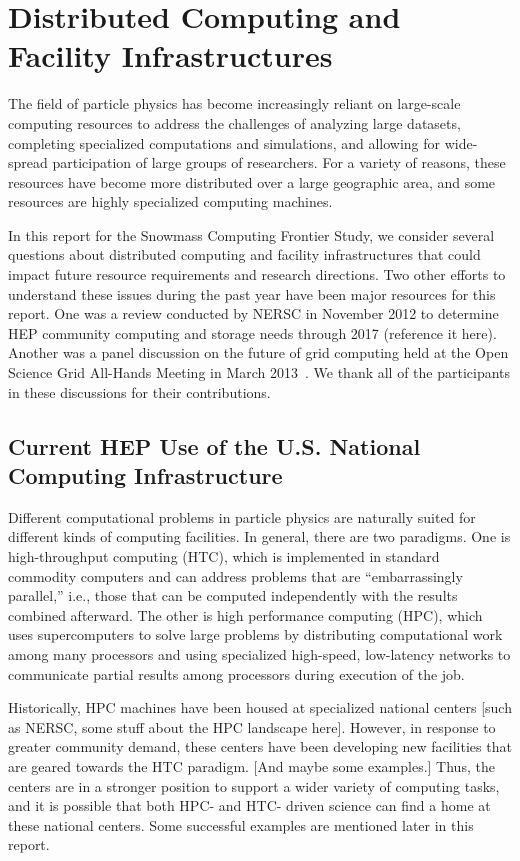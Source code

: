 \section{Distributed Computing and Facility Infrastructures}


The field of particle physics has become increasingly reliant on large-scale computing resources to address the challenges of analyzing large datasets, completing specialized computations and simulations, and allowing for wide-spread participation of large groups of researchers.  For a variety of reasons, these resources have become more distributed over a large geographic area, and some resources are highly specialized computing machines.

In this report for the Snowmass Computing Frontier Study, we consider several questions about distributed computing and facility infrastructures that could impact future resource requirements and research directions.  Two other efforts to understand these issues during the past year have been major resources for this report.  One was a review conducted by NERSC in November 2012 to determine HEP community computing and storage needs through 2017 (reference it here).  Another was a panel discussion on the future of grid computing held at the Open Science Grid All-Hands Meeting in March 2013~\cite{bib:OSGpanel}.  We thank all of the participants in these discussions for their contributions.

\subsection{Current HEP Use of the U.S. National Computing Infrastructure}

Different computational problems in particle physics are naturally suited for different kinds of computing facilities.  In general, there are two paradigms.  One is high-throughput computing (HTC), which is implemented in standard commodity computers and can address problems that are ``embarrassingly parallel,'' i.e., those that can be computed independently with the results combined afterward.  The other is high performance computing (HPC), which uses supercomputers to solve large problems by distributing computational work among many processors and using specialized high-speed, low-latency networks to communicate partial results among processors during execution of the job.

Historically, HPC machines have been housed at specialized national centers [such as NERSC, some stuff about the HPC landscape here].  However, in response to greater community demand, these centers have been developing new facilities that are geared towards the HTC paradigm.  [And maybe some examples.]  Thus, the centers are in a stronger position to support a wider variety of computing tasks, and it is possible that both HPC- and HTC- driven science can find a home at these national centers.  Some successful examples are mentioned later in this report.

